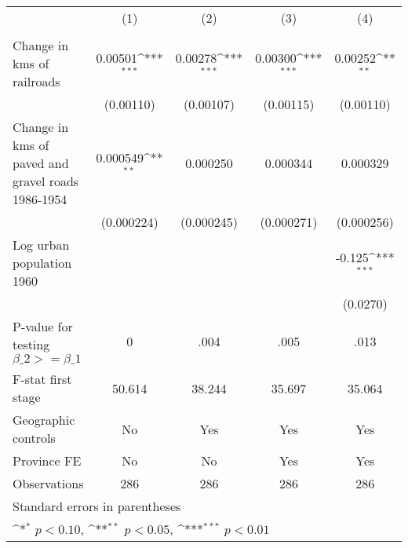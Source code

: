 {
\def\sym#1{\ifmmode^{#1}\else\(^{#1}\)\fi}
\begin{tabular}{l*{4}{c}}
\hline\hline
                &\multicolumn{1}{c}{(1)}&\multicolumn{1}{c}{(2)}&\multicolumn{1}{c}{(3)}&\multicolumn{1}{c}{(4)}\\
                &\multicolumn{1}{c}{}&\multicolumn{1}{c}{}&\multicolumn{1}{c}{}&\multicolumn{1}{c}{}\\
\hline
Change in kms of railroads&  0.00501\sym{***}&  0.00278\sym{***}&  0.00300\sym{***}&  0.00252\sym{**} \\
                &(0.00110)         &(0.00107)         &(0.00115)         &(0.00110)         \\
[1em]
Change in kms of paved and gravel roads 1986-1954& 0.000549\sym{**} & 0.000250         & 0.000344         & 0.000329         \\
                &(0.000224)         &(0.000245)         &(0.000271)         &(0.000256)         \\
[1em]
Log urban population 1960&                  &                  &                  &   -0.125\sym{***}\\
                &                  &                  &                  & (0.0270)         \\
\hline
P-value for testing $\beta\_{2} >= \beta\_{1}$&        0         &     .004         &     .005         &     .013         \\
F-stat first stage&   50.614         &   38.244         &   35.697         &   35.064         \\
Geographic controls&       No         &      Yes         &      Yes         &      Yes         \\
Province FE     &       No         &       No         &      Yes         &      Yes         \\
Observations    &      286         &      286         &      286         &      286         \\
\hline\hline
\multicolumn{5}{l}{\footnotesize Standard errors in parentheses}\\
\multicolumn{5}{l}{\footnotesize \sym{*} \(p<0.10\), \sym{**} \(p<0.05\), \sym{***} \(p<0.01\)}\\
\end{tabular}
}
